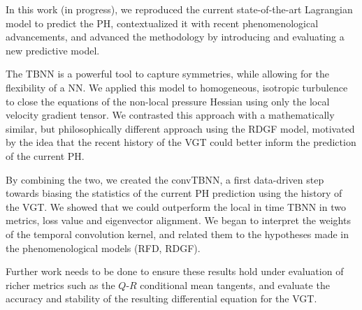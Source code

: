 In this work (in progress), we reproduced the current state-of-the-art Lagrangian model to predict the PH, contextualized it with recent phenomenological advancements, and advanced the methodology by introducing and evaluating a new predictive model.

The TBNN is a powerful tool to capture symmetries, while allowing for the flexibility of a NN. We applied this model to homogeneous, isotropic turbulence to close the equations of the non-local pressure Hessian using only the local velocity gradient tensor. We contrasted this approach with a mathematically similar, but philosophically different approach using the RDGF model, motivated by the idea that the recent history of the VGT could better inform the prediction of the current PH.

By combining the two, we created the convTBNN, a first data-driven step towards biasing the statistics of the current PH prediction using the history of the VGT. We showed that we could outperform the local in time TBNN in two metrics, loss value and eigenvector alignment. We began to interpret the weights of the temporal convolution kernel, and related them to the hypotheses made in the phenomenological models (RFD, RDGF).

Further work needs to be done to ensure these results hold under evaluation of richer metrics such as the $Q\text{-}R$ conditional mean tangents, and evaluate the accuracy and stability of the resulting differential equation for the VGT.